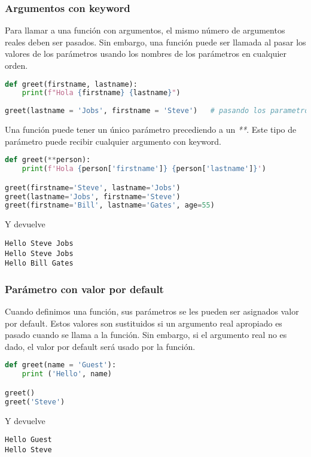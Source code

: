 	\subsubsection{Argumentos con keyword}
	Para llamar a una función con argumentos, el mismo número de argumentos reales deben ser pasados. Sin embargo, una función puede ser llamada al pasar los valores de los parámetros usando los nombres de los parámetros en cualquier orden.
	\begin{lstlisting}[language = {python}]
def greet(firstname, lastname):
    print(f"Hola {firstname} {lastname}")
    
greet(lastname = 'Jobs', firstname = 'Steve')   # pasando los parametros en cualquier orden usando keyword
	\end{lstlisting}
	Una función puede tener un único parámetro precediendo a un \emph{**}. Este tipo de parámetro puede recibir cualquier argumento con keyword.
	\begin{lstlisting}[language = {python}]
def greet(**person):
	print(f'Hola {person['firstname']} {person['lastname']}')

greet(firstname='Steve', lastname='Jobs')
greet(lastname='Jobs', firstname='Steve')
greet(firstname='Bill', lastname='Gates', age=55) 
	\end{lstlisting}
	Y devuelve
	\begin{lstlisting}[language = {[latex]tex}]
Hello Steve Jobs
Hello Steve Jobs
Hello Bill Gates
	\end{lstlisting}
	\subsubsection{Parámetro con valor por default}
	Cuando definimos una función, sus parámetros se les pueden ser asignados valor por default. Estos valores son sustituidos si un argumento real apropiado es pasado cuando se llama a la función. Sin embargo, si el argumento real no es dado, el valor por default será usado por la función.
	\begin{lstlisting}[language = {python}]
def greet(name = 'Guest'):
    print ('Hello', name)

greet()
greet('Steve')
	\end{lstlisting}
	Y devuelve
	\begin{lstlisting}[language = {[latex]tex}]
Hello Guest
Hello Steve
	\end{lstlisting}
